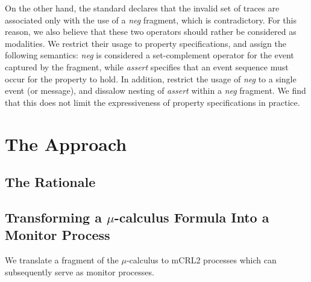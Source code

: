\documentclass[letter]{llncs}
\begin{document}
On the other hand, the standard declares that the
invalid set of traces are associated only with the use of
a \emph{neg} fragment, which is contradictory.
For this reason, we also believe that these two operators should rather be considered 
as modalities. We restrict their usage to property specifications, and assign the following semantics:
\emph{neg} is considered a set-complement operator for the event captured by the fragment, while \emph{assert}
specifies that an event sequence must occur for the property to hold. In addition, restrict the usage of \emph{neg} to a single event (or message),
and dissalow nesting of \emph{assert} within a \emph{neg} fragment.
We find that this does not limit the expressiveness of property specifications in practice.
\section{The Approach}
\label{sec:Approach}

\subsection{The Rationale}
\subsection{Transforming a $\mu$-calculus Formula Into a Monitor Process} 
We translate a fragment of the $\mu$-calculus to mCRL2 processes which
can subsequently serve as monitor processes.
\end{document}
